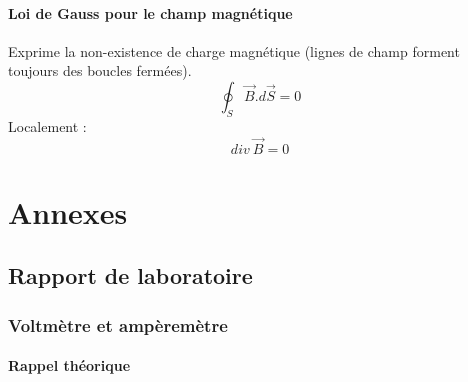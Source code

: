 \documentclass	[11pt, a4paper, openany]{book}
\begin{document}
\subsection{Loi de Gauss pour le champ magnétique}
Exprime la non-existence de charge magnétique (lignes de champ forment toujours des boucles fermées).
\begin{equation}
\oint_S \vec{B}.d\vec{S} = 0
\end{equation}
Localement :
\begin{equation}
div\ \vec{B} = 0
\end{equation}




























































\part{Annexes}
\appendix
\chapter{Rapport de laboratoire}
\section{Voltmètre et ampèremètre}
\subsection{Rappel théorique}
\end{document}

